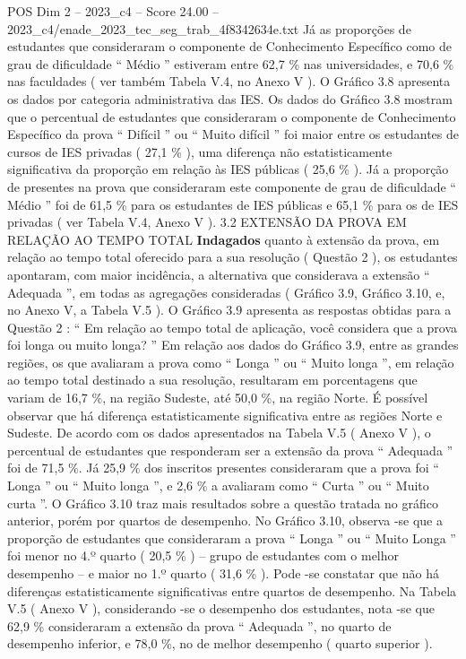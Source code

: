 \begin{textsample}{POS Dim 2 – 2023\_c4 – Score 24.00 – 2023\_c4/enade\_2023\_tec\_seg\_trab\_4f8342634e.txt}
Já as proporções de estudantes que consideraram o componente de Conhecimento Específico como de grau de dificuldade “ Médio ” estiveram entre 62,7 \% nas universidades, e 70,6 \% nas faculdades ( ver também Tabela V.4, no Anexo V ).
O Gráfico 3.8 apresenta os dados por categoria administrativa das IES.
Os dados do Gráfico 3.8 mostram que o percentual de estudantes que consideraram o componente de Conhecimento Específico da prova “ Difícil ” ou “ Muito difícil ” foi maior entre os estudantes de cursos de IES privadas ( 27,1 \% ), uma diferença não estatisticamente significativa da proporção em relação às IES públicas ( 25,6 \% ).
Já a proporção de presentes na prova que consideraram este componente de grau de dificuldade “ Médio ” foi de 61,5 \% para os estudantes de IES públicas e 65,1 \% para os de IES privadas ( ver Tabela V.4, Anexo V ). 3.2 EXTENSÃO DA PROVA EM RELAÇÃO AO TEMPO TOTAL \textbf{Indagados} quanto à extensão da prova, em relação ao tempo total oferecido para a sua resolução ( Questão 2 ), os estudantes apontaram, com maior incidência, a alternativa que considerava a extensão “ Adequada ”, em todas as agregações consideradas ( Gráfico 3.9, Gráfico 3.10, e, no Anexo V, a Tabela V.5 ).
O Gráfico 3.9 apresenta as respostas obtidas para a Questão 2 : “ Em relação ao tempo total de aplicação, você considera que a prova foi longa ou muito longa? ” Em relação aos dados do Gráfico 3.9, entre as grandes regiões, os que avaliaram a prova como “ Longa ” ou “ Muito longa ”, em relação ao tempo total destinado a sua resolução, resultaram em porcentagens que variam de 16,7 \%, na região Sudeste, até 50,0 \%, na região Norte.
É possível observar que há diferença estatisticamente significativa entre as regiões Norte e Sudeste.
De acordo com os dados apresentados na Tabela V.5 ( Anexo V ), o percentual de estudantes que responderam ser a extensão da prova “ Adequada ” foi de 71,5 \%.
Já 25,9 \% dos inscritos presentes consideraram que a prova foi “ Longa ” ou “ Muito longa ”, e 2,6 \% a avaliaram como “ Curta ” ou “ Muito curta ”.
O Gráfico 3.10 traz mais resultados sobre a questão tratada no gráfico anterior, porém por quartos de desempenho.
No Gráfico 3.10, observa -se que a proporção de estudantes que consideraram a prova “ Longa ” ou “ Muito Longa ” foi menor no 4.º quarto ( 20,5 \% ) – grupo de estudantes com o melhor desempenho – e maior no 1.º quarto ( 31,6 \% ).
Pode -se constatar que não há diferenças estatisticamente significativas entre quartos de desempenho.
Na Tabela V.5 ( Anexo V ), considerando -se o desempenho dos estudantes, nota -se que 62,9 \% consideraram a extensão da prova “ Adequada ”, no quarto de desempenho inferior, e 78,0 \%, no de melhor desempenho ( quarto superior ).

\end{textsample}
